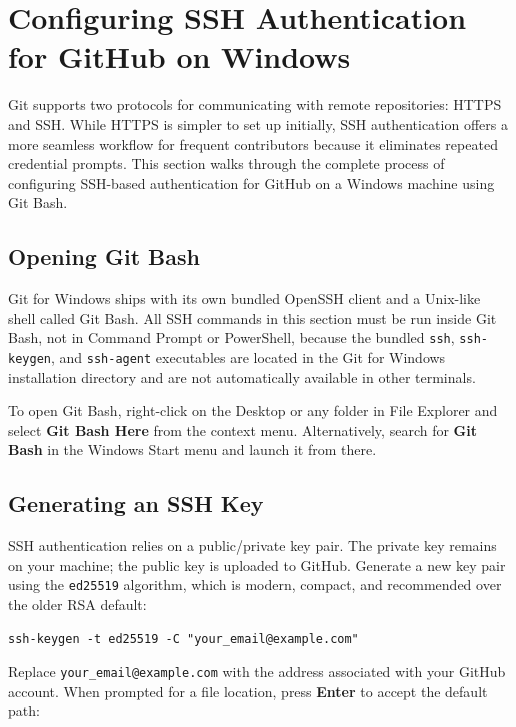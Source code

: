 \section{Configuring SSH Authentication for GitHub on Windows}
\label{sec:ssh-windows}

Git supports two protocols for communicating with remote repositories: HTTPS and SSH. While HTTPS is simpler to set up initially, SSH authentication offers a more seamless workflow for frequent contributors because it eliminates repeated credential prompts. This section walks through the complete process of configuring SSH-based authentication for GitHub on a Windows machine using Git Bash.

\subsection{Opening Git Bash}

Git for Windows ships with its own bundled OpenSSH client and a Unix-like shell called Git Bash. All SSH commands in this section must be run inside Git Bash, not in Command Prompt or PowerShell, because the bundled \texttt{ssh}, \texttt{ssh-keygen}, and \texttt{ssh-agent} executables are located in the Git for Windows installation directory and are not automatically available in other terminals.

To open Git Bash, right-click on the Desktop or any folder in File Explorer and select \textbf{Git Bash Here} from the context menu. Alternatively, search for \textbf{Git Bash} in the Windows Start menu and launch it from there.

\subsection{Generating an SSH Key}

SSH authentication relies on a public/private key pair. The private key remains on your machine; the public key is uploaded to GitHub. Generate a new key pair using the \texttt{ed25519} algorithm, which is modern, compact, and recommended over the older RSA default:

\begin{lstlisting}[style=bashstyle, caption={Generate an ed25519 SSH key pair}]
ssh-keygen -t ed25519 -C "your_email@example.com"
\end{lstlisting}

Replace \texttt{your\_email@example.com} with the address associated with your GitHub account. When prompted for a file location, press \textbf{Enter} to accept the default path:


